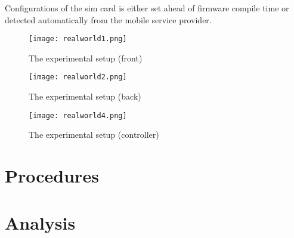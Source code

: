 \documentclass[../thesis.tex]{subfiles}
\begin{document}
Configurations of the sim card is either set ahead of firmware compile time or detected automatically from the mobile service provider.

\begin{figure}[!ht]
	\centering
	\texttt{[image: realworld1.png]}
	\caption{The experimental setup (front)}
	\label{fig:realworld1}
\end{figure}

\begin{figure}[!ht]
	\centering
	\texttt{[image: realworld2.png]}
	\caption{The experimental setup (back)}
	\label{fig:realworld2}
\end{figure}

\begin{figure}[!ht]
	\centering
	\texttt{[image: realworld4.png]}
	\caption{The experimental setup (controller)}
	\label{fig:realworld4}
\end{figure}

\section{Procedures} %



\section{Analysis}
\end{document}
